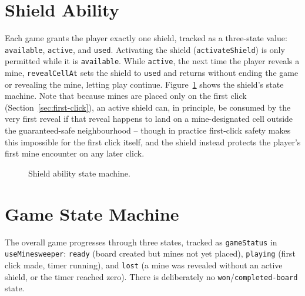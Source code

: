 \section{Shield Ability}
Each game grants the player exactly one shield, tracked as a three-state
value: \texttt{available}, \texttt{active}, and \texttt{used}. Activating
the shield (\texttt{activateShield}) is only permitted while it is
\texttt{available}. While \texttt{active}, the next time the player reveals
a mine, \texttt{revealCellAt} sets the shield to \texttt{used} and returns
without ending the game or revealing the mine, letting play continue.
Figure~\ref{fig:shield-state} shows the shield's state machine. Note that
because mines are placed only on the first click
(Section~\ref{sec:first-click}), an active shield can, in principle, be
consumed by the very first reveal if that reveal happens to land on a
mine-designated cell outside the guaranteed-safe neighbourhood -- though in
practice first-click safety makes this impossible for the first click
itself, and the shield instead protects the player's first mine encounter
on any later click.

\begin{figure}[htbp]
\centering
{}
\caption{Shield ability state machine.}
\label{fig:shield-state}
\end{figure}

\section{Game State Machine}
The overall game progresses through three states, tracked as
\texttt{gameStatus} in \texttt{useMinesweeper}: \texttt{ready} (board
created but mines not yet placed), \texttt{playing} (first click made,
timer running), and \texttt{lost} (a mine was revealed without an active
shield, or the timer reached zero). There is deliberately no
\texttt{won}/\texttt{completed-board} state.

